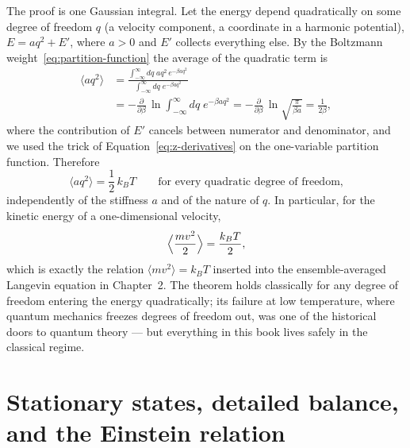 The proof is one Gaussian integral.
Let the energy depend quadratically on some degree of freedom $q$ (a velocity component, a coordinate in a harmonic potential), $E = a q^2 + E'$, where $a>0$ and $E'$ collects everything else.
By the Boltzmann weight~\eqref{eq:partition-function} the average of the quadratic term is
\begin{equation}\begin{split}\label{eq:equipartition-proof}
\langle a q^2\rangle
&= \frac{\displaystyle\int_{-\infty}^{\infty} dq\; a q^2\, e^{-\beta a q^2}}{\displaystyle\int_{-\infty}^{\infty} dq\; e^{-\beta a q^2}}\\
&= -\frac{\partial}{\partial\beta}\,\ln\!\int_{-\infty}^{\infty} dq\; e^{-\beta a q^2}
= -\frac{\partial}{\partial\beta}\,\ln\sqrt{\frac{\pi}{\beta a}}
= \frac{1}{2\beta},
\end{split}\end{equation}
where the contribution of $E'$ cancels between numerator and denominator, and we used the trick of Equation~\eqref{eq:z-derivatives} on the one-variable partition function.
Therefore
\begin{equation}\label{eq:equipartition}
\langle a q^2\rangle = \frac{1}{2}\,k_B T
\qquad\text{for every quadratic degree of freedom,}
\end{equation}
independently of the stiffness $a$ and of the nature of $q$.
In particular, for the kinetic energy of a one-dimensional velocity,
\begin{equation}\label{eq:equipartition-kinetic}
\Bigl\langle \frac{m v^2}{2}\Bigr\rangle = \frac{k_B T}{2},
\end{equation}
which is exactly the relation $\langle mv^2\rangle = k_B T$ inserted into the ensemble-averaged Langevin equation in Chapter~2.
The theorem holds classically for any degree of freedom entering the energy quadratically; its failure at low temperature, where quantum mechanics freezes degrees of freedom out, was one of the historical doors to quantum theory --- but everything in this book lives safely in the classical regime.


\section{Stationary states, detailed balance, and the Einstein relation}
\label{app:stationary}

